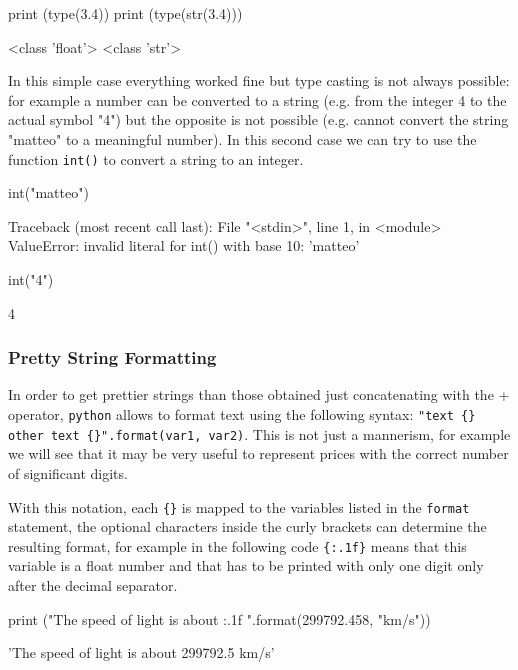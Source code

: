 \begin{ipython}
print (type(3.4)) 
print (type(str(3.4)))
\end{ipython}
\begin{ioutput}
<class 'float'>
<class 'str'>	
\end{ioutput}

In this simple case everything worked fine but type casting is not always possible: for example a number can be converted to a string (e.g. from the integer 4 to the actual symbol "4") but the opposite is not possible (e.g. cannot convert the string "matteo" to a meaningful number). In this second case we can try to use the function \texttt{int()} to convert a string to an integer.

\begin{ipython}
int("matteo")
\end{ipython}
\begin{ioutput}
Traceback (most recent call last):
  File "<stdin>", line 1, in <module>
ValueError: invalid literal for int() with base 10: 'matteo'
\end{ioutput}

\begin{ipython}
int("4") 
\end{ipython}
\begin{ioutput}
4
\end{ioutput}

\subsubsection{Pretty String Formatting}
In order to get prettier strings than those obtained just concatenating with the + operator, \texttt{python} allows to format text using the following syntax: \texttt{"text \{\} other text \{\}".format(var1, var2)}.
This is not just a mannerism, for example we will see that it may be very useful to represent prices with the correct 
number of significant digits.

With this notation, each \texttt{\{\}} is mapped to the variables listed in the \texttt{format} statement, the optional characters inside the curly brackets can determine the resulting format, for example in the following code \texttt{\{:.1f\}} means that this variable is a float number and that has to be printed with only one digit only after the decimal separator. 

\begin{ipython}
print ("The speed of light is about {:.1f} {}".format(299792.458, "km/s"))	
\end{ipython}
\begin{ioutput}
'The speed of light is about 299792.5 km/s'
\end{ioutput}

